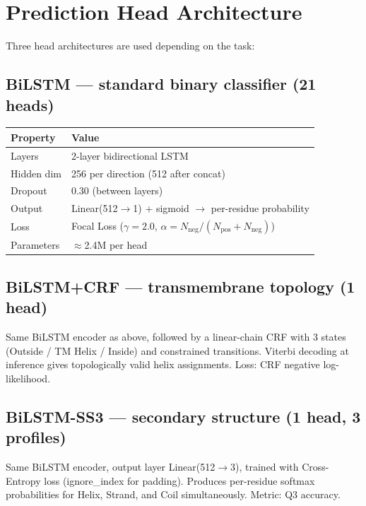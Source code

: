 \documentclass[11pt,a4paper]{article}
\begin{document}
\section{Prediction Head Architecture}

Three head architectures are used depending on the task:

\subsection{BiLSTM --- standard binary classifier (21 heads)}

\begin{tabular}{L{4.5cm} L{9.5cm}}
\toprule
\textbf{Property} & \textbf{Value} \\
\midrule
Layers & 2-layer bidirectional LSTM \\
Hidden dim & 256 per direction (512 after concat) \\
Dropout & 0.30 (between layers) \\
Output & Linear(512$\rightarrow$1) + sigmoid $\rightarrow$ per-residue probability \\
Loss & Focal Loss ($\gamma = 2.0$, $\alpha = N_{\mathrm{neg}}/(N_{\mathrm{pos}}+N_{\mathrm{neg}})$) \\
Parameters & $\approx$2.4M per head \\
\bottomrule
\end{tabular}

\subsection{BiLSTM+CRF --- transmembrane topology (1 head)}

Same BiLSTM encoder as above, followed by a linear-chain CRF with 3 states (Outside / TM Helix / Inside) and constrained transitions. Viterbi decoding at inference gives topologically valid helix assignments. Loss: CRF negative log-likelihood.

\subsection{BiLSTM-SS3 --- secondary structure (1 head, 3 profiles)}

Same BiLSTM encoder, output layer Linear(512$\rightarrow$3), trained with Cross-Entropy loss (ignore\_index for padding). Produces per-residue softmax probabilities for Helix, Strand, and Coil simultaneously. Metric: Q3 accuracy.
\end{document}

